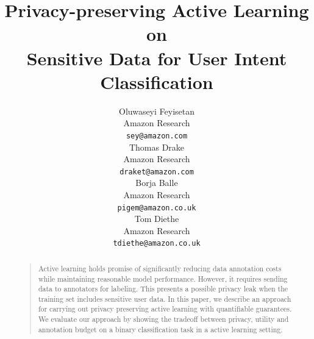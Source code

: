 \documentclass[letterpaper]{article}
\begin{document}
%
\title{Privacy-preserving Active Learning on \\ Sensitive Data for User Intent Classification}

\author{
  Oluwaseyi Feyisetan \\
  Amazon Research\\
  \texttt{sey@amazon.com} \\
 \And
 Thomas Drake \\
 Amazon Research\\
 \texttt{draket@amazon.com} \\
 \AND
 Borja Balle \\
 Amazon Research\\
 \texttt{pigem@amazon.co.uk} \\
 \And
 Tom Diethe \\
 Amazon Research\\
 \texttt{tdiethe@amazon.co.uk} \\
}

\maketitle
\begin{abstract}
\begin{quote}
Active learning holds promise of significantly reducing data annotation costs while maintaining reasonable model performance. However, it requires sending data to annotators for labeling. This presents a possible privacy leak when the training set includes sensitive user data. In this paper, we describe an approach for carrying out privacy preserving active learning with quantifiable guarantees. We evaluate our approach by showing the tradeoff between privacy, utility and annotation budget on a binary classification task in a active learning setting.
\end{quote}
\end{abstract}
\end{document}
